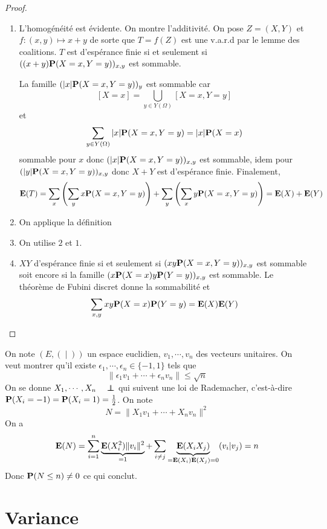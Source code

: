 \begin{proof}~
\begin{enumerate}
    \item L'homogénéité est évidente. On montre l'additivité. On pose $Z=(X,Y)$ et  $f:(x,y)\longmapsto x+y$ de sorte que $T=f(Z)$ est une v.a.r.d par le lemme des coalitions.  $T$ est d'espérance finie  si et seulement si $((x+y)\P(X=x,Y=y))_{x,y}$ est sommable.

        La famille $(|x|\P(X=x,Y=y))_{y}$ est sommable car \[
        [X=x]=\bigcup_{y \in  Y(\Omega)} [X=x,Y=y]  \] et \[   \sum_{y \in  Y(\Omega)}|x|\P(X=x,Y=y)=|x|\P(X=x)
        \]
        sommable pour $x$ donc $(|x|\P(X=x,Y=y))_{x,y}$ est sommable, idem pour $(|y|\P(X=x,Y=y))_{x,y}$ donc $X+Y$ est d'espérance finie. Finalement,  \[
            \E(T)=\sum_x \left( \sum_y x\P(X=x,Y=y) \right) +\sum_y \left( \sum_x y\P(X=x,Y=y) \right) =\E(X)+\E(Y)
        \] 
    \item On applique la définition
    \item On utilise $2$ et $1$.
    \item $XY$ d'espérance finie  si et seulement si $(xy\P(X=x,Y=y))_{x,y}$ est sommable soit encore si la famille  $(x\P(X=x)y\P(Y=y))_{x,y}$ est sommable. Le théorème de Fubini discret donne la sommabilité et \[
            \sum_{x,y}xy\P(X=x)\P(Y=y)=\E(X)\E(Y)
    \]
\end{enumerate}
\end{proof}

\begin{ex}
    On note $(E, (\;|\;))$ un espace euclidien,  $v_1,\cdots ,v_n$ des vecteurs unitaires. On veut montrer qu'il existe $\epsilon_1,\cdots ,\epsilon_n\in \{-1,1\} $ tels que \[
        \|\epsilon_1v_1+\cdots +\epsilon_nv_n\|\leq \sqrt{n}
    \] 
    On se donne $X_1,\cdots ,X_n \quad  \indep$ qui suivent une loi de Rademacher, c'est-à-dire $\P(X_i=-1)=\P(X_i=1)=\frac{1}{2}$. On note \[
        N=\|X_1v_1+\cdots +X_nv_n\|^2
    \] 
    On a \[
        \E(N)=\sum_{i=1}^n\underbrace{\E(X_i^2)\|v_i\|^2}_{=1}+\sum_{i\neq  j}\underbrace{\E(X_iX_j)}_{=\E(X_i)\E(X_j)=0}(v_i|v_j)=n
    \]
    Donc $\P(N\leq n)\neq 0$ ce qui conclut.
\end{ex}

\section{Variance}

